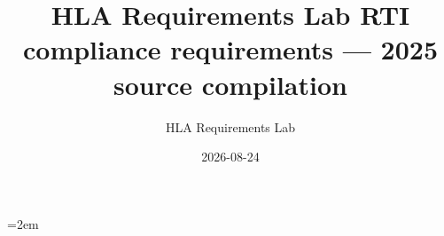 \documentclass[10pt,oneside]{article}
\title{HLA Requirements Lab RTI compliance requirements --- 2025 source compilation}
\author{HLA Requirements Lab}
\date{2026-08-24}
\begin{document}
    
    \tableofcontents
    \clearpage
    \RaggedRight
    \emergencystretch=2em
    
\end{document}
